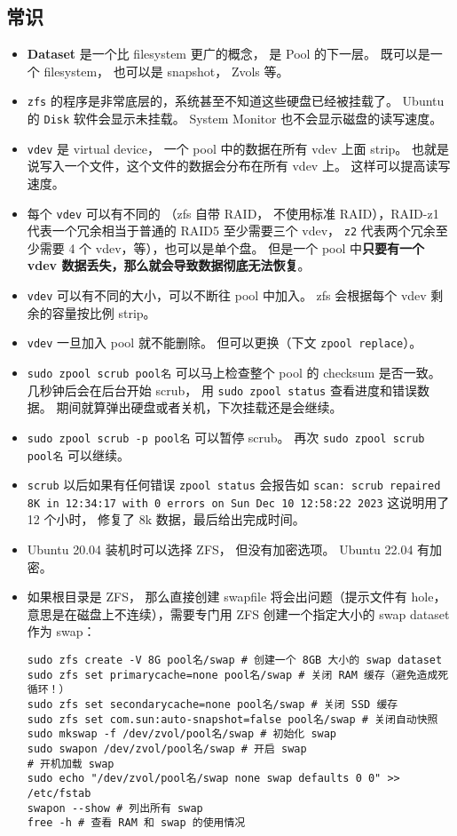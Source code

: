 \subsection{常识}
\begin{itemize}
\item \textbf{Dataset} 是一个比 filesystem 更广的概念， 是 Pool 的下一层。 既可以是一个 filesystem， 也可以是 snapshot， Zvols 等。
\item \verb`zfs` 的程序是非常底层的，系统甚至不知道这些硬盘已经被挂载了。 Ubuntu 的 \verb`Disk` 软件会显示未挂载。 System Monitor 也不会显示磁盘的读写速度。
\item \verb`vdev` 是 virtual device， 一个 pool 中的数据在所有 vdev 上面 strip。 也就是说写入一个文件，这个文件的数据会分布在所有 vdev 上。 这样可以提高读写速度。
\item 每个 \verb`vdev` 可以有不同的  （zfs 自带 RAID， 不使用标准 RAID），RAID-z1 代表一个冗余相当于普通的 RAID5 至少需要三个 vdev， \verb`z2` 代表两个冗余至少需要 4 个 vdev，等），也可以是单个盘。 但是一个 pool 中\textbf{只要有一个 vdev 数据丢失，那么就会导致数据彻底无法恢复}。
\item \verb`vdev` 可以有不同的大小，可以不断往 pool 中加入。 zfs 会根据每个 vdev 剩余的容量按比例 strip。
\item \verb`vdev` 一旦加入 pool 就不能删除。 但可以更换（下文 \verb`zpool replace`）。
\item \verb`sudo zpool scrub pool名` 可以马上检查整个 pool 的 checksum 是否一致。 几秒钟后会在后台开始 scrub， 用 \verb`sudo zpool status` 查看进度和错误数据。 期间就算弹出硬盘或者关机，下次挂载还是会继续。
\item \verb`sudo zpool scrub -p pool名` 可以暂停 scrub。 再次 \verb`sudo zpool scrub pool名` 可以继续。
\item \verb`scrub` 以后如果有任何错误 \verb`zpool status` 会报告如 \verb`scan: scrub repaired 8K in 12:34:17 with 0 errors on Sun Dec 10 12:58:22 2023` 这说明用了 12 个小时， 修复了 8k 数据，最后给出完成时间。
\item Ubuntu 20.04 装机时可以选择 ZFS， 但没有加密选项。 Ubuntu 22.04 有加密。
\item 如果根目录是 ZFS， 那么直接创建 swapfile 将会出问题（提示文件有 hole， 意思是在磁盘上不连续），需要专门用 ZFS 创建一个指定大小的 swap dataset 作为 swap：
\begin{lstlisting}[language=none]
sudo zfs create -V 8G pool名/swap # 创建一个 8GB 大小的 swap dataset
sudo zfs set primarycache=none pool名/swap # 关闭 RAM 缓存（避免造成死循环！）
sudo zfs set secondarycache=none pool名/swap # 关闭 SSD 缓存
sudo zfs set com.sun:auto-snapshot=false pool名/swap # 关闭自动快照
sudo mkswap -f /dev/zvol/pool名/swap # 初始化 swap
sudo swapon /dev/zvol/pool名/swap # 开启 swap
# 开机加载 swap
sudo echo "/dev/zvol/pool名/swap none swap defaults 0 0" >> /etc/fstab
swapon --show # 列出所有 swap
free -h # 查看 RAM 和 swap 的使用情况
\end{lstlisting}
\end{itemize}

